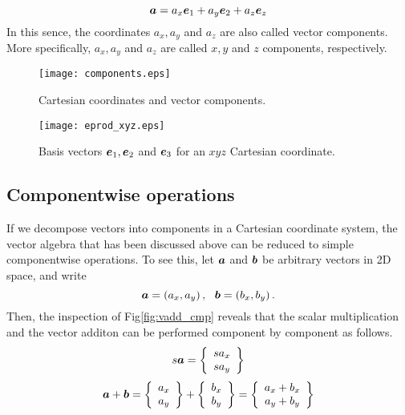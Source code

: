 \documentclass[10pt,a4j]{article}
\begin{document}
\begin{equation}
    \mbox{\boldmath $a$}=a_x\mbox{\boldmath $e$}_1+a_y\mbox{\boldmath $e$}_2+a_z\mbox{\boldmath $e$}_z
    \label{eqn:}
\end{equation}
In this sence, the coordinates $a_x, a_y$ and $a_z$ are also called vector components. More specifically, $a_x, a_y$ and $a_z$ are called $x, y$ and $z$ components, respectively.
\begin{figure}[h]
    \begin{center}
    \texttt{[image: components.eps]} 
    \end{center}
    \caption{Cartesian coordinates and vector components.} 
    \label{fig:fig1_7}
\end{figure}
\begin{figure}[h]
    \begin{center}
    \texttt{[image: eprod\_xyz.eps]} 
    \end{center}
    \caption{Basis vectors $\mbox{\boldmath $e$}_1, \mbox{\boldmath $e$}_2$ and $\mbox{\boldmath $e$}_3$ for an $xyz$ Cartesian coordinate.} 
    \label{fig:fig1_9}
\end{figure}
%
\subsection{Componentwise operations}
If we decompose vectors into components in a Cartesian coordinate system, the vector algebra that has been discussed above can be reduced to simple componentwise operations. To see this, let $\mbox{\boldmath $a$}$ and $\mbox{\boldmath $b$}$ be arbitrary vectors in 2D space, and write 
\begin{equation}
    \fat{a}=\left(a_x, a_y \right), \ \ 
    \fat{b}=\left(b_x, b_y \right).
    \label{eqn:}
\end{equation}
Then, the inspection of Fig\ref{fig:vadd_cmp} reveals that  
the scalar multiplication and the vector additon can be 
performed component by component as follows.
\begin{equation}
    s\mbox{\boldmath $a$}
    =
    \left\{
        \begin{array}{c}
            sa_x \\
            sa_y 
        \end{array}
    \right\}
    \label{eqn:}
\end{equation}
\begin{equation}
    \mbox{\boldmath $a$}
    +
    \mbox{\boldmath $b$}
    =
    \left\{
        \begin{array}{c}
            a_x \\
            a_y 
        \end{array}
    \right\}
    +
    \left\{
        \begin{array}{c}
            b_x \\
            b_y 
        \end{array}
    \right\}
    =
    \left\{
        \begin{array}{c}
            a_x+b_x \\
            a_y+b_y
        \end{array}
    \right\}
    \label{eqn:}
\end{equation}
\end{document}
